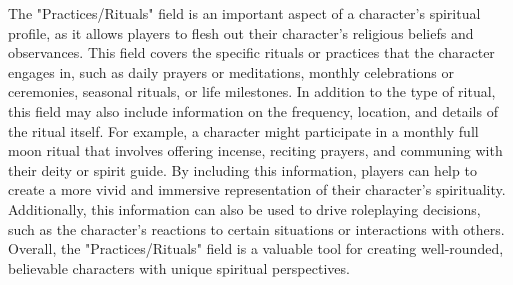 \documentclass[12pt]{book}  %
\begin{document}
The "Practices/Rituals" field is an important aspect of a character's spiritual profile, as it allows players to flesh out their character's religious beliefs and observances. This field covers the specific rituals or practices that the character engages in, such as daily prayers or meditations, monthly celebrations or ceremonies, seasonal rituals, or life milestones. In addition to the type of ritual, this field may also include information on the frequency, location, and details of the ritual itself. For example, a character might participate in a monthly full moon ritual that involves offering incense, reciting prayers, and communing with their deity or spirit guide. By including this information, players can help to create a more vivid and immersive representation of their character's spirituality. Additionally, this information can also be used to drive roleplaying decisions, such as the character's reactions to certain situations or interactions with others. Overall, the "Practices/Rituals" field is a valuable tool for creating well-rounded, believable characters with unique spiritual perspectives.
\end{document}
